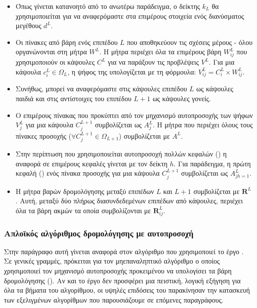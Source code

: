 \begin{itemize}
  \item Όπως γίνεται κατανοητό από το ανωτέρω παράδειγμα, ο δείκτης $k_L$ θα χρησιμοποιείται για να αναφερόμαστε στα επιμέρους στοιχεία ενός διανύσματος μεγέθους $d^L$.
  \item Οι πίνακες από βάρη ενός επιπέδου $L$ που αποθηκεύουν τις σχέσεις μέρους - όλου οργανώνονται στη μήτρα $W^L$. Η μήτρα περιέχει όλα τα επιμέρους βάρη $W_{ij}^L$ που χρησιμοποιούν οι κάψουλες $C^L$ για να παράξουν τις προβλέψεις $V^L$. Για μια κάψουλα $c_i^L \in \Omega_L$, η ψήφος της υπολογίζεται με τη φόρμουλα: $V_{ij}^L = C_i^L \times W_{ij}^L$.
  \item Συνήθως, μπορεί να αναφερόμαστε στις κάψουλες επιπέδου $L$ ως κάψουλες παιδιά και στις αντίστοιχες του επιπέδου $L+1$ ως κάψουλες γονείς.
  \item Ο επιμέρους πίνακας που προκύπτει από τον μηχανισμό αυτο\textendash προσοχής των ψήφων $V^L_j$ για μια κάψουλα $C_j^{L+1}$ συμβολίζεται ως $Α^L_j$. Η μήτρα που περιέχει όλους τους πίνακες προσοχής ($\forall C_j^{L+1} \in \Omega_{L+1}$) συμβολίζεται με $A^L$.
  \item Στην περίπτωση που χρησιμοποιείται αυτο\textendash προσοχή πολλών κεφαλών () η αναφορά σε επιμέρους κεφαλές γίνεται με τον δείκτη $h$. Για παράδειγμα, η πρώτη κεφαλή () ενός πίνακα προσοχής για μια κάψουλα $C^{L+1}_j$ συμβολίζεται ως $A_{jh=1}^L$.
  \item Η μήτρα βαρών δρομολόγησης μεταξύ επιπέδων $L$ και $L + 1$ συμβολίζεται με $\mathbf{R}^L$. Αυτή, μεταξύ δύο πλήρως διασυνδεδεμένων επιπέδων από κάψουλες, περιέχει όλα τα βάρη ακμών τα οποία συμβολίζονται με $\mathbf{R}_{ij}^L$.
\end{itemize}


\subsubsection{Απλοϊκός αλγόριθμος δρομολόγησης με αυτο\textendash προσοχή}

Στην παράγραφο αυτή γίνεται αναφορά στον αλγόριθμο που χρησιμοποιεί το έργο \cite{mazzia2021efficient}. Σε γενικές γραμμές, πρόκειται για τον μη\textendash επαναληπτικό αλγόριθμο ο οποίος χρησιμοποιεί τον μηχανισμό αυτο\textendash προσοχής προκειμένου να υπολογίσει τα βάρη δρομολόγησης (). Αν και το έργο δεν προσφέρει μια πειστική, λογική εξήγηση για όλα τα βήματα του αλγορίθμου, οι υψηλές επιδόσεις του παρακίνησαν την κατασκευή των εξελιγμένων αλγορίθμων που παρουσιάζουμε σε επόμενες παραγράφους.\par

